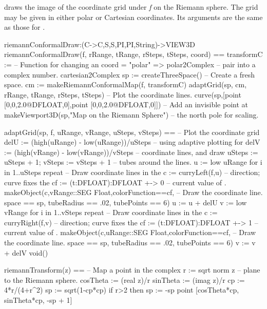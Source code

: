 draws the image of the coordinate grid under {\it f} on the Riemann sphere.
The grid may be given in either polar or Cartesian coordinates.
Its arguments are the same as those for .
\begin{xmpLinesNoResetPlain}
riemannConformalDraw:(C->C,S,S,PI,PI,String)->VIEW3D
riemannConformalDraw(f, rRange, tRange,
                     rSteps, tSteps, coord) ==
  transformC :=                                          -- Function for changing an 
    coord = "polar" => polar2Complex                     -- \quad{}pair into a complex number.
    cartesian2Complex
  sp := createThreeSpace()                               -- Create a fresh space.
  cm := makeRiemannConformalMap(f, transformC)
  adaptGrid(sp, cm, rRange, tRange, rSteps, tSteps)      -- Plot the coordinate lines.
  curve(sp,[point [0,0,2.0@DFLOAT,0],point [0,0,2.0@DFLOAT,0]]) -- Add an invisible point at
  makeViewport3D(sp,"Map on the Riemann Sphere")         -- \quad{}the north pole for scaling.

adaptGrid(sp, f, uRange, vRange,  uSteps, vSteps) ==     -- Plot the coordinate grid
  delU := (high(uRange) - low(uRange))/uSteps            -- \quad{}using adaptive plotting for
  delV := (high(vRange) - low(vRange))/vSteps            -- \quad{}coordinate lines, and draw
  uSteps := uSteps + 1; vSteps := vSteps + 1             -- \quad{}tubes around the lines.
  u := low uRange
  for i in 1..uSteps repeat                              -- Draw coordinate lines in the 
    c := curryLeft(f,u)                                  -- \quad{}direction; curve  fixes the
    cf := (t:DFLOAT):DFLOAT +-> 0                        -- \quad{}current value of .
    makeObject(c,vRange::SEG Float,colorFunction==cf,    -- Draw the  coordinate line.
      space == sp, tubeRadius == .02, tubePoints == 6)
    u := u + delU
  v := low vRange
  for i in 1..vSteps repeat                              -- Draw coordinate lines in the 
    c := curryRight(f,v)                                 -- \quad{}direction; curve  fixes the
    cf := (t:DFLOAT):DFLOAT +-> 1                        -- \quad{}current value of .
    makeObject(c,uRange::SEG Float,colorFunction==cf,    -- Draw the  coordinate line.
      space == sp, tubeRadius == .02, tubePoints == 6)
    v := v + delV
  void()

riemannTransform(z) ==                                   -- Map a point in the complex
  r := sqrt norm z                                       -- \quad{}plane to the Riemann sphere.
  cosTheta := (real z)/r
  sinTheta := (imag z)/r
  cp := 4*r/(4+r^2)
  sp := sqrt(1-cp*cp)
  if r>2 then sp := -sp
  point [cosTheta*cp, sinTheta*cp, -sp + 1]


\end{xmpLinesNoResetPlain}
